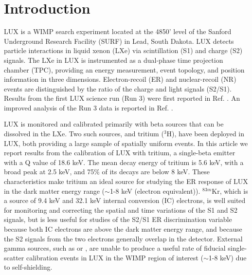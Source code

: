 \section{Introduction}

LUX is a WIMP search experiment located at the 4850' level of the Sanford Underground Research Facility (SURF) in Lead, South Dakota. LUX detects particle interactions in liquid xenon (LXe) via scintillation (S1) and charge (S2) signals. The LXe in LUX is instrumented as a dual-phase time projection chamber (TPC), providing an energy measurement, event topology, and position information in three dimensions. Electron-recoil (ER) and nuclear-recoil (NR) events are distinguished by the ratio of the charge and light signals (S2/S1). Results from the first LUX science run (Run 3) were first reported in Ref. \cite{lux-prl}. An improved analysis of the Run 3 data is reported in Ref. \cite{lux-reanalysis}.

LUX is monitored and calibrated primarily with beta sources that can be dissolved in the LXe. Two such sources,  \krsrc\cite{Kastens:2009rt, Baudis} and tritium ($^{3}$H), have been deployed in LUX, both providing a large sample of spatially uniform events. In this article we report results from the calibration of LUX with tritium, a single-beta emitter with a Q value of 18.6 keV\cite{Tritium_Q}. The mean decay energy of tritium is 5.6 keV, with a broad peak at 2.5 keV, and 75\% of its decays are below 8 keV\cite{Tritium_Mean,Tritium_Eq}. These characteristics make tritium an ideal source for studying the ER response of LUX in the dark matter energy range ($\sim$1-8 keV (electron equivalent)). $^{83m}$Kr, which is a source of 9.4 keV and 32.1 keV internal conversion  (IC) electrons, is well suited for monitoring and correcting the spatial and time variations of the S1 and S2 signals, but is less useful for studies of the S2/S1 ER discrimination variable because both IC electrons are above the dark matter energy range, and because the S2 signals from the two electrons generally overlap in the detector. External gamma sources, such as \cssrc or \thsrc, are unable to produce a useful rate of fiducial single-scatter calibration events in LUX in the WIMP region of interest ($\sim$1-8 keV) due to self-shielding. 

